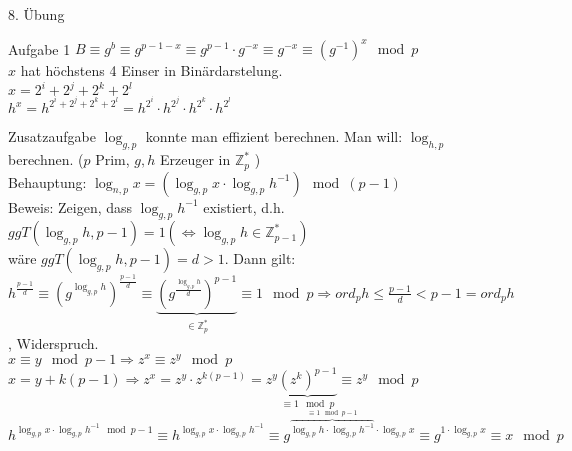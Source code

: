 \begin{section}{8. Übung}
 \begin{subsection}{Aufgabe 1}
  $B \equiv g^b \equiv g^{p-1-x} \equiv g^{p-1}\cdot g^{-x} \equiv g^{-x} \equiv (g^{-1})^x \mod p$\\
  $x$ hat höchstens 4 Einser in Binärdarstelung. \\
  $x=2^i+2^j+2^k+2^l$\\
  $h^x = h^{2^i+2^j+2^k+2^l} = h^{2^i} \cdot h^{2^j} \cdot h^{2^k} \cdot h^{2^l}$
 \end{subsection}

 \begin{subsection}{Zusatzaufgabe}
  $\log_{g,p}$ konnte man effizient berechnen. Man will: $\log_{h,p}$ berechnen. ($p$ Prim, $g,h$ Erzeuger in $\mathbb{Z}_p^*$ )\\
  Behauptung:  $\log_{n,p} x= (\log_{g,p} x \cdot \log_{g,p} h ^{-1}) \mod (p-1)$\\
  Beweis: Zeigen, dass $\log_{g,p} h ^{-1}$ existiert, d.h. \\
  $ggT(\log_{g,p} h, p-1) = 1 (\Leftrightarrow \log_{g,p} h \in \mathbb{Z}_{p-1}^*)$\\
  wäre $ggT(\log_{g,p} h, p-1) = d > 1$. Dann gilt: $h^{\frac{p-1}{d}} \equiv (g^{\log_{g,p} h})^{\frac{p-1}{d}} \equiv \underbrace{(g^{\frac{\log_{g,p} h}{d}})^{p-1}}_{\in \mathbb{Z}_p^*} \equiv 1 \mod p \Rightarrow ord_p h \leq \frac{p-1}{d}<p-1 = ord_p h$, Widerspruch.\\
  $x \equiv y \mod p-1 \Rightarrow z^x \equiv z^y \mod p$\\
  $x = y +k(p-1) \Rightarrow z^x = z^y\cdot z^{k(p-1)} = z^y \underbrace{(z^k)^{p-1}}_{\equiv 1 \mod p} \equiv z^y \mod p $\\
  $h^{\log_{g,p} x \cdot \log_{g,p} h ^{-1} \mod p-1} \equiv h^{\log_{g,p} x \cdot \log_{g,p} h ^{-1}} \equiv g^{\overbrace{\log_{g,p} h \cdot \log_{g,p} h ^{-1}}^{\equiv 1 \mod p-1}\cdot \log_{g,p} x} \equiv g^{1\cdot \log_{g,p} x} \equiv x \mod p$
 \end{subsection}
 

\end{section}
